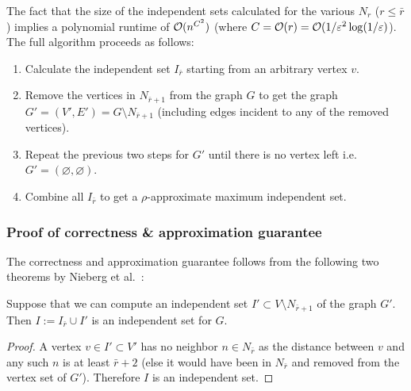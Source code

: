 The fact that the size of the independent sets calculated for the various $N_r$ ($r\leq \bar r$) implies a polynomial runtime of $\mathcal{O}(n^{C^2}) $ (where $C = \mathcal{O}(r)  = \mathcal{O}(1/\varepsilon^2 \log (1/\varepsilon) $).
The full algorithm proceeds as follows:
\begin{enumerate}
\item Calculate the independent set $I_{\bar r}$ starting from an arbitrary vertex $v$.
\item Remove the vertices in $N_{\bar r +1 }$ from the graph $G$ to get the graph $G' = (V',E') = G\setminus N_{\bar r +1}$ (including edges incident to any of the removed vertices).
\item Repeat the previous two steps for $G'$ until there is no vertex left i.e.\ $G' = (\varnothing,\varnothing)$.
\item Combine all $I_{\bar r}$ to get a $\rho$-approximate maximum independent set.
\end{enumerate}




\subsubsection{Proof of correctness \& approximation guarantee}

The correctness and approximation guarantee follows from the following two theorems by Nieberg et al.~\cite{nieberg}:
\begin{theorem}
Suppose that we can compute an independent set $I'\subset V\setminus N_{\bar r+1}$ of the graph $G'$. Then $I:=I_{\bar r} \cup I'$ is an independent set for $G$.
\end{theorem}
\begin{proof}
A vertex $v\in I'\subset V'$ has no neighbor $n\in N_{\bar r}$ as the distance between $v$ and any such $n$ is at least $\bar r +2$ (else it would have been in $N_{\bar r}$ and removed from the vertex set of $G'$). Therefore $I$ is an independent set. 
\end{proof}

